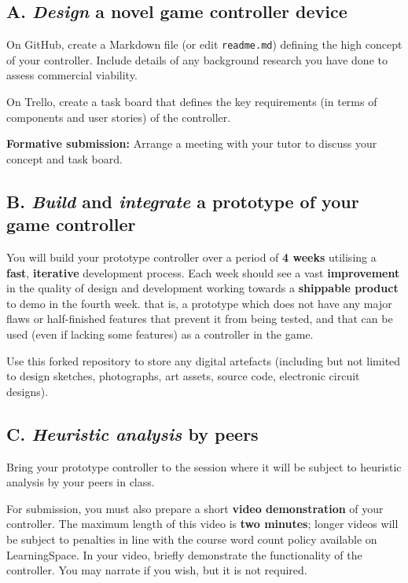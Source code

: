 \documentclass{../fal_assignment}
\begin{document}
\subsection*{A. \emph{Design} a novel game controller device}

On GitHub, create a Markdown file (or edit \texttt{readme.md})
defining the high concept of your controller.
Include details of any background research you have done to assess commercial viability.

On Trello, create a task board that defines the key requirements
(in terms of components and user stories) of the controller.

\textbf{Formative submission:} Arrange a meeting with your tutor to discuss your concept and task board.

\subsection*{B. \emph{Build} and  \emph{integrate} a prototype of your game controller}

You will build your prototype controller over a period of \textbf{4 weeks} utilising a \textbf{fast}, \textbf{iterative} development process.
Each week should see a vast \textbf{improvement} in the quality of design and development working towards a \textbf{shippable product} to demo in the fourth week. that is, a prototype which does not have any major flaws or half-finished features that prevent it from being tested, and that can be used (even if lacking some features) as a controller in the game.

Use this forked repository to store any digital artefacts (including but not limited to
design sketches, photographs, art assets, source code, electronic circuit designs).

\subsection*{C. \emph{Heuristic analysis} by peers}

Bring your prototype controller to the session where it will be subject to heuristic analysis by your peers in class.

For submission, you must also prepare a short \textbf{video demonstration} of your controller.
The maximum length of this video is \textbf{two minutes};
longer videos will be subject to penalties in line with the course word count policy available on LearningSpace.
In your video, briefly demonstrate the functionality of the controller.
You may narrate if you wish, but it is not required.
\end{document}
